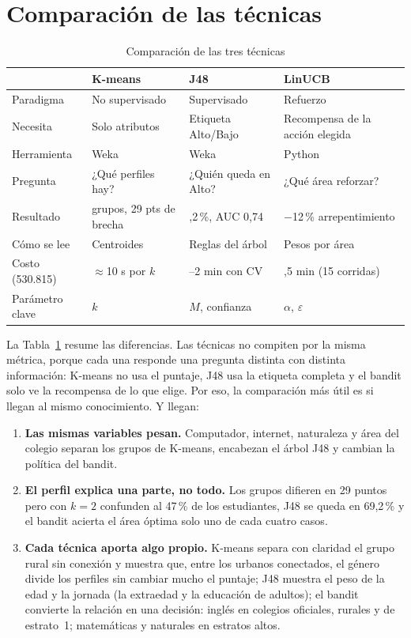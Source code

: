 \documentclass[conference]{IEEEtran}
\begin{document}
\section{Comparación de las técnicas}
\begin{table}[t]
\caption{Comparación de las tres técnicas}
\label{tab:comp}
\centering\footnotesize
\setlength{\tabcolsep}{3pt}\begin{tabular}{>{\raggedright\arraybackslash}p{1.4cm}>{\raggedright\arraybackslash}p{2.0cm}>{\raggedright\arraybackslash}p{2.0cm}>{\raggedright\arraybackslash}p{2.0cm}}
\toprule
 & K-means & J48 & LinUCB \\
\midrule
Paradigma & No supervisado & Supervisado & Refuerzo \\
Necesita & Solo atributos & Etiqueta Alto/Bajo & Recompensa de la acción elegida \\
Herramienta & Weka & Weka & Python \\
Pregunta & ¿Qué perfiles hay? & ¿Quién queda en Alto? & ¿Qué área reforzar? \\
Resultado & 3 grupos, 29 pts de brecha & 69,2\,\%, AUC 0,74 & $-$12\,\% arrepentimiento \\
Cómo se lee & Centroides & Reglas del árbol & Pesos por área \\
Costo (530.815) & $\approx$10 s por $k$ & 1--2 min con CV & 5,5 min (15 corridas) \\
Parámetro clave & $k$ & $M$, confianza & $\alpha$, $\varepsilon$ \\
\bottomrule
\end{tabular}
\end{table}

La Tabla~\ref{tab:comp} resume las diferencias. Las técnicas no compiten por la misma métrica, porque cada una responde una pregunta distinta con distinta información: K-means no usa el puntaje, J48 usa la etiqueta completa y el bandit solo ve la recompensa de lo que elige. Por eso, la comparación más útil es si llegan al mismo conocimiento. Y llegan:
\begin{enumerate}
\item \textbf{Las mismas variables pesan.} Computador, internet, naturaleza y área del colegio separan los grupos de K-means, encabezan el árbol J48 y cambian la política del bandit.
\item \textbf{El perfil explica una parte, no todo.} Los grupos difieren en 29 puntos pero con $k=2$ confunden al 47\,\% de los estudiantes, J48 se queda en 69,2\,\% y el bandit acierta el área óptima solo uno de cada cuatro casos.
\item \textbf{Cada técnica aporta algo propio.} K-means separa con claridad el grupo rural sin conexión y muestra que, entre los urbanos conectados, el género divide los perfiles sin cambiar mucho el puntaje; J48 muestra el peso de la edad y la jornada (la extraedad y la educación de adultos); el bandit convierte la relación en una decisión: inglés en colegios oficiales, rurales y de estrato~1; matemáticas y naturales en estratos altos.
\end{enumerate}
\end{document}
